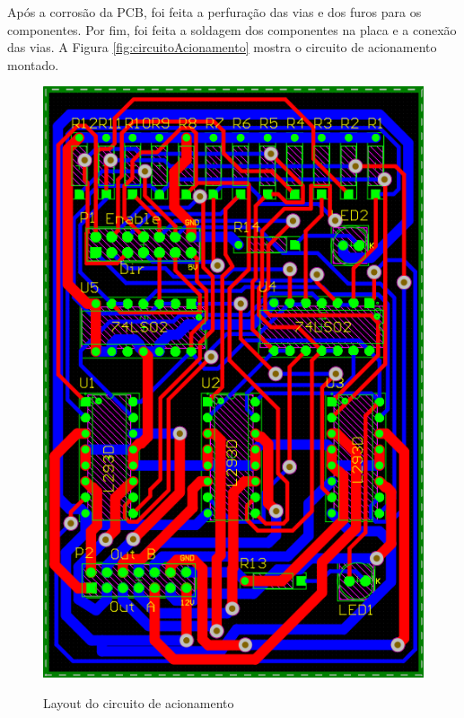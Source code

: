 Após a corrosão da PCB, foi feita a perfuração das vias e dos furos para os componentes.
Por fim, foi feita a soldagem dos componentes na placa e a conexão das vias.
A Figura \ref{fig:circuitoAcionamento} mostra o circuito de acionamento montado.

\begin{figure}[H]
    \begin{minipage}{.45\textwidth}
        \centering
        \caption{Layout do circuito de acionamento}
        \includegraphics[keepaspectratio=true, width=0.9\linewidth]
            {img/placa-controle-layout.png}
        \label{fig:circuitoAcionamentoLayout}
    \end{minipage}
    \begin{minipage}{.10\textwidth}
    \end{minipage}
    \begin{minipage}{.45\textwidth}

\end{minipage}
\end{figure}
